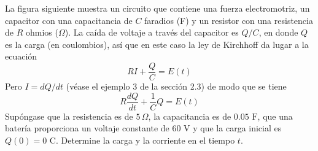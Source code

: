 \item La figura siguiente muestra un circuito que contiene una fuerza electromotriz, un capacitor con una capacitancia de $C$ faradios (F) y un resistor con una resistencia de $R$ ohmios ($\Omega$). La caída de voltaje a través del capacitor es $Q/C$, en donde $Q$ es la carga (en coulombios), así que en este caso la ley de Kirchhoff da lugar a la ecuación
    \[ RI + \frac{Q}{C} = E(t) \]
    Pero $I = dQ/dt$ (véase el ejemplo 3 de la sección 2.3) de modo que se tiene
    \[ R \frac{dQ}{dt} + \frac{1}{C} Q = E(t) \]
    Supóngase que la resistencia es de $5 \, \Omega$, la capacitancia es de $0.05 \text{ F}$, que una batería proporciona un voltaje constante de 60 V y que la carga inicial es $Q(0) = 0 \text{ C}$. Determine la carga y la corriente en el tiempo $t$.
    
    \vspace{0.5cm}
    \begin{center}
    \end{center}
